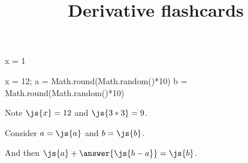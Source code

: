 \documentclass{ximera}
\title{Derivative flashcards}
\begin{document}
\begin{sageCell}
  x = 1
\end{sageCell}

\begin{javascript}
  x = 12;
  a = Math.round(Math.random()*10)
  b = Math.round(Math.random()*10)
\end{javascript}

Note $\js{x} = 12$ and $\js{3*3} = 9$.

\begin{problem}
  Consider $a = \js{a}$ and $b = \js{b}$.

  And then $\js{a} + \answer{\js{b-a}} = \js{b}$.
\end{problem}
\end{document}
